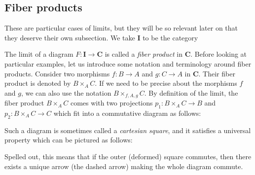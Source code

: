 \documentclass[12pt,a4paper]{amsart}
\theoremstyle{plain}
\theoremstyle{definition}
\theoremstyle{remark}
\begin{document}
\subsection{Fiber products}

These are particular cases of limits, but they will be so relevant later on that they deserve their own subsection.
We take $\mathbf{I}$ to be the category
\begin{center}
\end{center}

The limit of a diagram $F \colon \mathbf{I} \to \mathbf{C}$ is called a \textit{fiber product} in $\mathbf{C}$.
Before looking at particular examples, let us introduce some notation and terminology around fiber products.
Consider two morphisms $f \colon B \to A$ and $g \colon C \to A$ in $\mathbf{C}$.
Their fiber product is denoted by $B \times_{A} C$.
If we need to be precise about the morphisms $f$ and $g$, we can also use the notation $B \times_{f,A,g} C$.
By definition of the limit, the fiber product $B \times_{A} C$ comes with two projections $p_{1} \colon B \times_{A} C \to B$ and $p_{2} \colon B \times_{A} C \to C$ which fit into a commutative diagram as follows:
\begin{center}
\end{center}
Such a diagram is sometimes called a \textit{cartesian square}, and it satisfies a universal property which can be pictured as follows:
\begin{center}
\end{center}
Spelled out, this means that if the outer (deformed) square commutes, then there exists a unique arrow (the dashed arrow) making the whole diagram commute.
\end{document}
